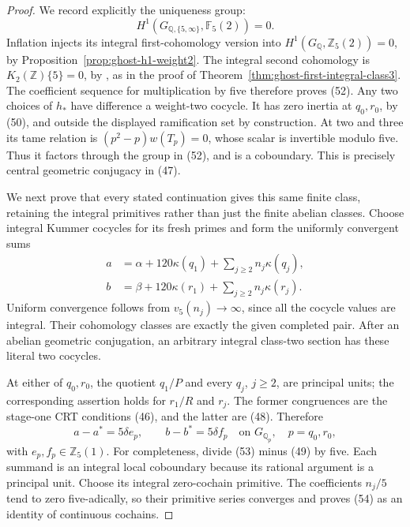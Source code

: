\begin{proof}
We record explicitly the uniqueness group:
\[
 H^1(G_{\mathbb Q,\{5,\infty\}},\mathbb F_5(2))=0.
                                                        \tag{52}
\]
Inflation injects its integral first-cohomology
version into
\(H^1(G_{\mathbb Q},\mathbb Z_5(2))=0\), by
Proposition~\ref{prop:ghost-h1-weight2}.
The integral second cohomology is
\(K_2(\mathbb Z)\{5\}=0\), by
\cite[VI.8.2 and Table VI.10.1.1]{GhostWeibelKbook},
as in the proof of
Theorem~\ref{thm:ghost-first-integral-class3}.
The coefficient sequence for multiplication by five
therefore proves (52). Any two choices of \(h_*\)
have difference a weight-two cocycle. It has zero
inertia at \(q_0,r_0\), by (50), and outside the
displayed ramification set by construction. At two
and three its tame relation is
\((p^2-p)w(T_p)=0\), whose scalar is invertible
modulo five. Thus it factors through the group in
(52), and is a coboundary. This is precisely central
geometric conjugacy in (47).

We next prove that every stated continuation gives
this same finite class, retaining the integral
primitives rather than just the finite abelian
classes. Choose integral Kummer cocycles for its
fresh primes and form the uniformly convergent sums
\[
 \begin{split}
 a&=\alpha+120\kappa(q_1)+
                   \sum_{j\ge2}n_j\kappa(q_j),\\
 b&=\beta+120\kappa(r_1)+
                   \sum_{j\ge2}n_j\kappa(r_j).
 \end{split}                                         \tag{53}
\]
Uniform convergence follows from
\(v_5(n_j)\longrightarrow\infty\), since all
the cocycle values are integral. Their cohomology
classes are exactly the given completed pair.
After an abelian geometric conjugation, an arbitrary
integral class-two section has these literal two
cocycles.

At either of \(q_0,r_0\), the quotient
\(q_1/P\) and every \(q_j\), \(j\ge2\), are
principal units; the corresponding assertion holds
for \(r_1/R\) and \(r_j\). The former congruences
are the stage-one CRT conditions (46), and the
latter are (48). Therefore
\[
 a-a^*=5\delta e_p,\qquad b-b^*=5\delta f_p
            \quad\text{on }G_{\mathbb Q_p},
                   \quad p=q_0,r_0,                  \tag{54}
\]
with \(e_p,f_p\in\mathbb Z_5(1)\).
For completeness, divide (53) minus (49) by five.
Each summand is an integral local coboundary because
its rational argument is a principal unit. Choose
its integral zero-cochain primitive. The coefficients
\(n_j/5\) tend to zero five-adically, so their
primitive series converges and proves (54) as an
identity of continuous cochains.


\end{proof}
